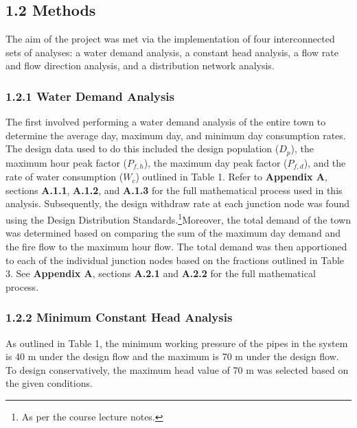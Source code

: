 \documentclass[]{article}
\begin{document}
	\subsection{1.2 Methods}
\noindent The aim of the project was met via the implementation of four interconnected sets of analyses: a water demand analysis, a constant head analysis, a flow rate and flow direction analysis, and a distribution network analysis.
\subsubsection{1.2.1 Water Demand Analysis} 
\noindent The first involved performing a water demand analysis of the entire town to determine the average day, maximum day, and minimum day consumption rates. The design data used to do this included the design population ($D_p$), the maximum hour peak factor ($P_{{f,h}}$), the maximum day peak factor ($P_{{f,d}}$), and the rate of water consumption ($W_c$) outlined in Table 1. Refer to \textbf{Appendix A}, sections \textbf{A.1.1}, \textbf{A.1.2}, and \textbf{A.1.3} for the full mathematical process used in this analysis. Subsequently, the design withdraw rate at each junction node was found using the Design Distribution Standards.\footnote{As per the course lecture notes.}Moreover, the total demand of the town was determined based on comparing the sum of the maximum day demand and the fire flow to the maximum hour flow. The total demand was then apportioned to each of the individual junction nodes based on the fractions outlined in Table 3. See \textbf{Appendix A}, sections \textbf{A.2.1} and \textbf{A.2.2} for the full mathematical process.
\subsubsection{1.2.2 Minimum Constant Head Analysis} 
\noindent As outlined in Table 1, the minimum working pressure of the pipes in the system is 40 m under the design flow and the maximum is 70 m under the design flow. To design conservatively, the maximum head value of 70 m was selected based on the given conditions. 
\end{document}

